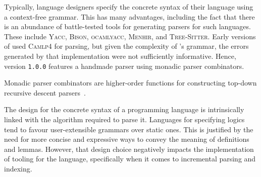

Typically, language designers specify the concrete syntax of their language using a context-free grammar.
This has many advantages, including the fact that there is an abundance of battle-tested tools for generating parsers for such languages.
These include \textsc{Yacc}, \textsc{Bison}, \textsc{ocamlyacc}, \textsc{Menhir}, and \textsc{Tree-Sitter}.
Early versions of \Beluga used \textsc{Camlp4} for parsing, but given the complexity of \Beluga's grammar, the errors generated by that implementation were not sufficiently informative.
Hence, \Beluga version \texttt{1.0.0} features a handmade parser using monadic parser combinators.


Monadic parser combinators are higher-order functions for constructing top-down recursive descent parsers~\cite{Burge1975-BURRPT, hutton1996monadic, leijen2001parsec, generalparsercombs}.



The design for the concrete syntax of a programming language is intrinsically linked with the algorithm required to parse it.
Languages for specifying logics tend to favour user-extensible grammars over static ones.
This is justified by the need for more concise and expressive ways to convey the meaning of definitions and lemmas.
However, that design choice negatively impacts the implementation of tooling for the language, specifically when it comes to incremental parsing and indexing.



